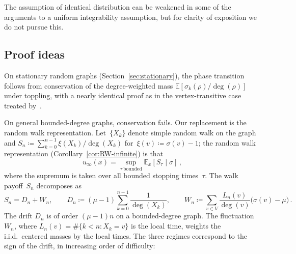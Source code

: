 \documentclass[aop]{imsart}
\theoremstyle{plain}
\theoremstyle{definition}
\newcommand{\E}{\mathbb{E}}
\begin{document}
	The assumption of identical distribution can be weakened in some of the arguments to a uniform integrability assumption, but for clarity of exposition we do not pursue this.
	
	
	\subsection{Proof ideas}
	On stationary random graphs (Section~\ref{sec:stationary}), the phase transition follows from conservation of the degree-weighted mass $\E[\sigma_k(\rho)/\deg(\rho)]$ under toppling, with a nearly identical proof as in the vertex-transitive case treated by~\citet{div-sand-crit}.
	
	On general bounded-degree graphs, conservation fails. Our replacement is the random walk representation. Let~$\{X_k\}$ denote simple random walk on the graph and $S_n\coloneqq\sum_{k=0}^{n-1}\xi(X_k)/\deg(X_k)$ for~$\xi(v)\coloneqq\sigma(v)-1$; the random walk representation (Corollary~\ref{cor:RW-infinite}) is that
	\[
	u_\infty(x)=\sup_{\tau\ \mathrm{bounded}}\E_x[S_\tau\mid\sigma]\, , 
	\]
	where the supremum is taken over all bounded stopping times~$\tau$. The walk payoff~$S_n$ decomposes as
	\begin{equation}
		S_n = D_n + W_n,\qquad
		D_n \coloneqq (\mu - 1)\sum_{k=0}^{n-1} \frac{1}{\deg(X_k)},\qquad
		W_n \coloneqq \sum_{v\in V}\frac{L_n(v)}{\deg(v)}\bigl(\sigma(v)-\mu\bigr)\,.
		\label{eq:dn-wn-stuff}
	\end{equation}
	The drift $D_n$ is of order $(\mu-1)n$ on a bounded-degree graph. The fluctuation $W_n$, where $L_n(v)=\#\{k<n:X_k=v\}$ is the local time, weights the i.i.d.\ centered masses by the local times. The three regimes correspond to the sign of the drift, in increasing order of difficulty:
\end{document}
